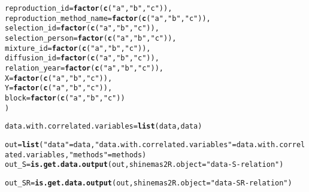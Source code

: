 \documentclass{article}\usepackage[]{graphicx}\usepackage[]{color}
\makeatletter
\newcommand{\hlstr}[1]{\textcolor[rgb]{0.192,0.494,0.8}{#1}}%
\newcommand{\hlstd}[1]{\textcolor[rgb]{0.345,0.345,0.345}{#1}}%
\newcommand{\hlkwb}[1]{\textcolor[rgb]{0.69,0.353,0.396}{#1}}%
\newcommand{\hlkwc}[1]{\textcolor[rgb]{0.333,0.667,0.333}{#1}}%
\newcommand{\hlkwd}[1]{\textcolor[rgb]{0.737,0.353,0.396}{\textbf{#1}}}%
\newenvironment{kframe}{%
 \def\at@end@of@kframe{}%
 \ifinner\ifhmode%
  \def\at@end@of@kframe{\end{minipage}}%
  \begin{minipage}{\columnwidth}%
 \fi\fi%
 \def\FrameCommand##1{\hskip\@totalleftmargin \hskip-\fboxsep
 \colorbox{shadecolor}{##1}\hskip-\fboxsep
     \hskip-\linewidth \hskip-\@totalleftmargin \hskip\columnwidth}%
 \MakeFramed {\advance\hsize-\width
   \@totalleftmargin\z@ \linewidth\hsize
   \@setminipage}}%
 {\par\unskip\endMakeFramed%
 \at@end@of@kframe}
\newenvironment{knitrout}{}{} %
\makeatother
\begin{document}
\begin{appendices}
\begin{knitrout}
\begin{kframe}
\begin{alltt}
        \hlkwc{reproduction_id} \hlstd{=} \hlkwd{factor}\hlstd{(}\hlkwd{c}\hlstd{(}\hlstr{"a"}\hlstd{,} \hlstr{"b"}\hlstd{,} \hlstr{"c"}\hlstd{)),}
        \hlkwc{reproduction_method_name} \hlstd{=} \hlkwd{factor}\hlstd{(}\hlkwd{c}\hlstd{(}\hlstr{"a"}\hlstd{,} \hlstr{"b"}\hlstd{,} \hlstr{"c"}\hlstd{)),}
        \hlkwc{selection_id} \hlstd{=} \hlkwd{factor}\hlstd{(}\hlkwd{c}\hlstd{(}\hlstr{"a"}\hlstd{,} \hlstr{"b"}\hlstd{,} \hlstr{"c"}\hlstd{)),}
        \hlkwc{selection_person} \hlstd{=} \hlkwd{factor}\hlstd{(}\hlkwd{c}\hlstd{(}\hlstr{"a"}\hlstd{,} \hlstr{"b"}\hlstd{,} \hlstr{"c"}\hlstd{)),}
        \hlkwc{mixture_id} \hlstd{=} \hlkwd{factor}\hlstd{(}\hlkwd{c}\hlstd{(}\hlstr{"a"}\hlstd{,} \hlstr{"b"}\hlstd{,} \hlstr{"c"}\hlstd{)),}
        \hlkwc{diffusion_id} \hlstd{=} \hlkwd{factor}\hlstd{(}\hlkwd{c}\hlstd{(}\hlstr{"a"}\hlstd{,} \hlstr{"b"}\hlstd{,} \hlstr{"c"}\hlstd{)),}
        \hlkwc{relation_year} \hlstd{=} \hlkwd{factor}\hlstd{(}\hlkwd{c}\hlstd{(}\hlstr{"a"}\hlstd{,} \hlstr{"b"}\hlstd{,} \hlstr{"c"}\hlstd{)),}
        \hlkwc{X} \hlstd{=} \hlkwd{factor}\hlstd{(}\hlkwd{c}\hlstd{(}\hlstr{"a"}\hlstd{,} \hlstr{"b"}\hlstd{,} \hlstr{"c"}\hlstd{)),}
        \hlkwc{Y} \hlstd{=} \hlkwd{factor}\hlstd{(}\hlkwd{c}\hlstd{(}\hlstr{"a"}\hlstd{,} \hlstr{"b"}\hlstd{,} \hlstr{"c"}\hlstd{)),}
        \hlkwc{block} \hlstd{=} \hlkwd{factor}\hlstd{(}\hlkwd{c}\hlstd{(}\hlstr{"a"}\hlstd{,} \hlstr{"b"}\hlstd{,} \hlstr{"c"}\hlstd{))}
        \hlstd{)}

\hlstd{data.with.correlated.variables} \hlkwb{=} \hlkwd{list}\hlstd{(data, data)}

\hlstd{out} \hlkwb{=} \hlkwd{list}\hlstd{(}\hlstr{"data"} \hlstd{= data,} \hlstr{"data.with.correlated.variables"} \hlstd{= data.with.correlated.variables,} \hlstr{"methods"} \hlstd{= methods)}
\hlstd{out_S} \hlkwb{=} \hlkwd{is.get.data.output}\hlstd{(out,} \hlkwc{shinemas2R.object} \hlstd{=} \hlstr{"data-S-relation"}\hlstd{)}
\end{alltt}


{\ttfamily\noindent\itshape{}}\begin{alltt}
\hlstd{out_SR} \hlkwb{=} \hlkwd{is.get.data.output}\hlstd{(out,} \hlkwc{shinemas2R.object} \hlstd{=} \hlstr{"data-SR-relation"}\hlstd{)}
\end{alltt}


{\ttfamily\noindent\itshape{}}\end{kframe}
\end{knitrout}




\newpage

\end{appendices}
\end{document}
